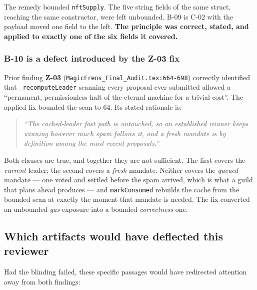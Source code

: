 \documentclass[11pt,a4paper]{article}
\newcommand{\code}[1]{\texttt{\small #1}}
\newcommand{\fileref}[1]{\texttt{\scriptsize #1}}
\begin{document}
The remedy bounded \code{nftSupply}. The five string fields of the same struct, reaching
the same constructor, were left unbounded. B-09 is C-02 with the payload moved one field
to the left. \textbf{The principle was correct, stated, and applied to exactly one of the
six fields it covered.}

\subsubsection{B-10 is a defect introduced by the Z-03 fix}

Prior finding \textbf{Z-03} (\fileref{MagicFrens\_Final\_Audit.tex:664-698}) correctly
identified that \code{\_recomputeLeader} scanning every proposal ever submitted allowed a
``permanent, permissionless halt of the eternal machine for a trivial cost''. The applied
fix bounded the scan to 64. Its stated rationale is:

\begin{quote}\itshape
``The cached-leader fast path is untouched, so an established winner keeps winning however
much spam follows it, and a fresh mandate is by definition among the most recent
proposals.''
\end{quote}

\noindent Both clauses are true, and together they are not sufficient. The first covers the
\emph{current} leader; the second covers a \emph{fresh} mandate. Neither covers the
\emph{queued} mandate --- one voted and settled before the spam arrived, which is what a
guild that plans ahead produces --- and \code{markConsumed} rebuilds the cache from the
bounded scan at exactly the moment that mandate is needed. The fix converted an unbounded
\emph{gas} exposure into a bounded \emph{correctness} one.

\subsection{Which artifacts would have deflected this reviewer}

Had the blinding failed, these specific passages would have redirected attention away from
both findings:
\end{document}
